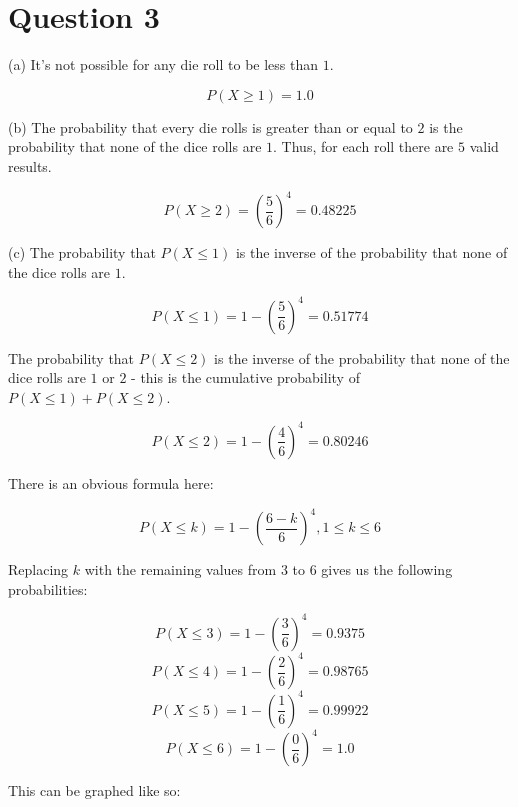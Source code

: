 \documentclass[12pt]{article}
\begin{document}
\section*{Question 3}

\noindent (a) It's not possible for any die roll to be less than $1$.

$$ P(X \geq 1) = 1.0 $$

\noindent (b) The probability that every die rolls is greater than or equal to $2$ is the probability that none of the dice rolls are $1$. Thus, for each roll there are $5$ valid results.

$$ P(X \geq 2) = \left( \frac{5}{6} \right)^4 = 0.48225 $$

\noindent (c) The probability that $P(X \leq 1)$ is the inverse of the probability that none of the dice rolls are $1$.

$$ P(X \leq 1) = 1 - \left( \frac{5}{6} \right)^4 = 0.51774 $$

\indent The probability that $P(X \leq 2)$ is the inverse of the probability that none of the dice rolls are $1$ or $2$ - this is the cumulative probability of $P(X \leq 1) + P(X \leq 2)$.

$$ P(X \leq 2) = 1 - \left( \frac{4}{6} \right)^4 = 0.80246 $$

\indent There is an obvious formula here:

$$ P(X \leq k) = 1 - \left( \frac{6 - k}{6} \right)^4, 1 \leq k \leq 6 $$

\indent Replacing $k$ with the remaining values from $3$ to $6$ gives us the following probabilities:

$$ P(X \leq 3) = 1 - \left( \frac{3}{6} \right)^4 = 0.9375 $$
$$ P(X \leq 4) = 1 - \left( \frac{2}{6} \right)^4 = 0.98765 $$
$$ P(X \leq 5) = 1 - \left( \frac{1}{6} \right)^4 = 0.99922 $$
$$ P(X \leq 6) = 1 - \left( \frac{0}{6} \right)^4 = 1.0 $$

\indent This can be graphed like so:

\begin{center}
\end{center}
\end{document}

